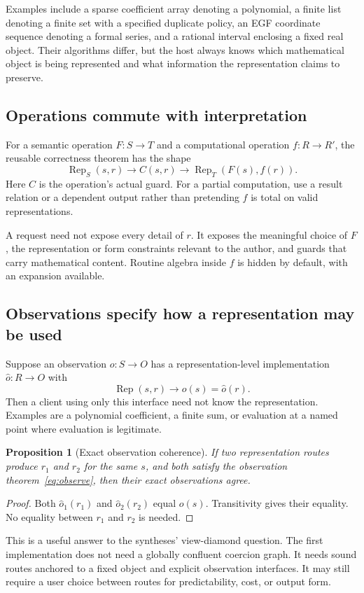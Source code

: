 \documentclass[11pt,a4paper]{article}
\newcommand{\Rep}{\operatorname{Rep}}
\newtheorem{proposition}{Proposition}[section]
\theoremstyle{definition}
\theoremstyle{remark}
\begin{document}
Examples include a sparse coefficient array denoting a polynomial, a finite list denoting a finite set with a specified duplicate policy, an EGF coordinate sequence denoting a formal series, and a rational interval enclosing a fixed real object. Their algorithms differ, but the host always knows which mathematical object is being represented and what information the representation claims to preserve.

\subsection{Operations commute with interpretation}
For a semantic operation $F:S\to T$ and a computational operation $f:R\to R'$, the reusable correctness theorem has the shape
\begin{equation}\label{eq:commute}
\Rep_S(s,r)\longrightarrow C(s,r)\longrightarrow
\Rep_T(F(s),f(r)).
\end{equation}
Here $C$ is the operation's actual guard. For a partial computation, use a result relation or a dependent output rather than pretending $f$ is total on valid representations.

A request need not expose every detail of $r$. It exposes the meaningful choice of $F$, the representation or form constraints relevant to the author, and guards that carry mathematical content. Routine algebra inside $f$ is hidden by default, with an expansion available.

\subsection{Observations specify how a representation may be used}
Suppose an observation $o:S\to O$ has a representation-level implementation $\widehat o:R\to O$ with
\begin{equation}\label{eq:observe}
\Rep(s,r)\longrightarrow o(s)=\widehat o(r).
\end{equation}
Then a client using only this interface need not know the representation. Examples are a polynomial coefficient, a finite sum, or evaluation at a named point where evaluation is legitimate.

\begin{proposition}[Exact observation coherence]\label{prop:coherence}
If two representation routes produce $r_1$ and $r_2$ for the same $s$, and both satisfy the observation theorem~\eqref{eq:observe}, then their exact observations agree.
\end{proposition}
\begin{proof}
Both $\widehat o_1(r_1)$ and $\widehat o_2(r_2)$ equal $o(s)$. Transitivity gives their equality. No equality between $r_1$ and $r_2$ is needed.
\end{proof}
This is a useful answer to the syntheses' view-diamond question. The first implementation does not need a globally confluent coercion graph. It needs sound routes anchored to a fixed object and explicit observation interfaces. It may still require a user choice between routes for predictability, cost, or output form.
\end{document}
